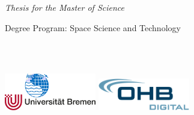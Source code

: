 \begin{titlingpage} %
\thispagestyle{empty} 
\begin{figure}
\end{figure}
\begin{center}
\begin{large}
  \textit{Thesis for the Master of Science}\\
\end{large}
\vspace{1cm}Degree Program: Space Science and Technology\\ \vspace{1cm} 
\vspace{6cm} %
\begin{large} 
\textbf{\thetitle} 
\end{large}
\theauthor\\
\thedate\\
\vspace{13cm} %

\includegraphics[width=0.3\textwidth]{img/res/uniLogoIUP.png}
\hspace{4cm}
\includegraphics[width=0.3\textwidth]{img/res/logo_ohb_digital.png}

\end{center}
\end{titlingpage}
